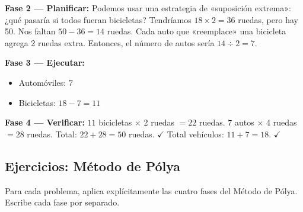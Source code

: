\documentclass[12pt, letterpaper]{article}
\begin{document}
\begin{cuadrosolucion}
  \textbf{Fase 2 — Planificar:}
  Podemos usar una estrategia de «suposición extrema»: ¿qué pasaría si todos fueran bicicletas? Tendríamos $18 \times 2 = 36$ ruedas, pero hay 50. Nos faltan $50 - 36 = 14$ ruedas. Cada auto que «reemplace» una bicicleta agrega 2 ruedas extra. Entonces, el número de autos sería $14 \div 2 = 7$.
\end{cuadrosolucion}

\begin{cuadrosolucion}
  \textbf{Fase 3 — Ejecutar:}
  \begin{itemize}
    \item Automóviles: $7$
    \item Bicicletas: $18 - 7 = 11$
  \end{itemize}
\end{cuadrosolucion}

\begin{cuadrosolucion}
  \textbf{Fase 4 — Verificar:}
  $11$ bicicletas $\times$ 2 ruedas $= 22$ ruedas. $7$ autos $\times$ 4 ruedas $= 28$ ruedas. Total: $22 + 28 = 50$ ruedas. $\checkmark$ Total vehículos: $11 + 7 = 18$. $\checkmark$
\end{cuadrosolucion}

\newpage

\subsection{Ejercicios: Método de Pólya}
Para cada problema, aplica explícitamente las cuatro fases del Método de Pólya. Escribe cada fase por separado.
\end{document}
